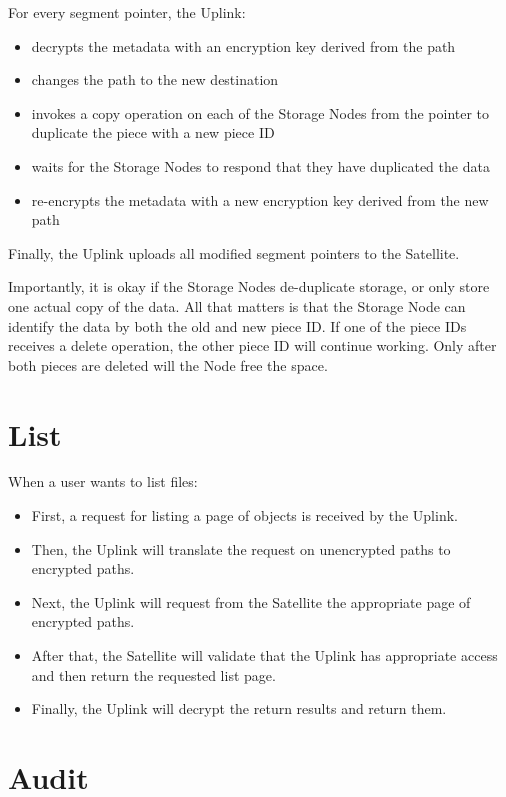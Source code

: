 \documentclass[8pt,fleqn,openany]{book}
\begin{document}
For every segment pointer, the Uplink:
  \begin{itemize}
  \item decrypts the metadata with an encryption key derived from the path
  \item changes the path to the new destination
  \item invokes a copy operation on each of the Storage Nodes from the pointer
    to duplicate the piece with a new piece ID
  \item waits for the Storage Nodes to respond that they have duplicated the
    data
  \item re-encrypts the metadata with a new encryption key derived from the
    new path
  \end{itemize}

Finally, the Uplink uploads all modified segment pointers to the Satellite.

Importantly, it is okay if the Storage Nodes de-duplicate storage, or only
store one actual copy of the data. All that matters is that the Storage Node
can identify the data by both the old and new piece ID. If one of the piece
IDs receives a delete operation, the other piece ID will continue working.
Only after both pieces are deleted will the Node free the space.

\section{List}

When a user wants to list files:

\begin{itemize}
\item First, a request for listing a page of objects is received by the Uplink.
\item Then, the Uplink will translate the request on unencrypted paths to encrypted
  paths.
\item Next, the Uplink will request from the Satellite the appropriate page of
  encrypted paths.
\item After that, the Satellite will validate that the Uplink has appropriate access
  and then return the requested list page.
\item Finally, the Uplink will decrypt the return results and return them.
\end{itemize}

\section{Audit}
\end{document}
